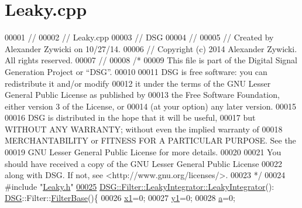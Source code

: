 \hypertarget{_leaky_8cpp_source}{\section{Leaky.\+cpp}
\label{_leaky_8cpp_source}
}

\begin{DoxyCode}
00001 \textcolor{comment}{//}
00002 \textcolor{comment}{//  Leaky.cpp}
00003 \textcolor{comment}{//  DSG}
00004 \textcolor{comment}{//}
00005 \textcolor{comment}{//  Created by Alexander Zywicki on 10/27/14.}
00006 \textcolor{comment}{//  Copyright (c) 2014 Alexander Zywicki. All rights reserved.}
00007 \textcolor{comment}{//}
00008 \textcolor{comment}{/*}
00009 \textcolor{comment}{ This file is part of the Digital Signal Generation Project or “DSG”.}
00010 \textcolor{comment}{}
00011 \textcolor{comment}{ DSG is free software: you can redistribute it and/or modify}
00012 \textcolor{comment}{ it under the terms of the GNU Lesser General Public License as published by}
00013 \textcolor{comment}{ the Free Software Foundation, either version 3 of the License, or}
00014 \textcolor{comment}{ (at your option) any later version.}
00015 \textcolor{comment}{}
00016 \textcolor{comment}{ DSG is distributed in the hope that it will be useful,}
00017 \textcolor{comment}{ but WITHOUT ANY WARRANTY; without even the implied warranty of}
00018 \textcolor{comment}{ MERCHANTABILITY or FITNESS FOR A PARTICULAR PURPOSE.  See the}
00019 \textcolor{comment}{ GNU Lesser General Public License for more details.}
00020 \textcolor{comment}{}
00021 \textcolor{comment}{ You should have received a copy of the GNU Lesser General Public License}
00022 \textcolor{comment}{ along with DSG.  If not, see <http://www.gnu.org/licenses/>.}
00023 \textcolor{comment}{ */}
00024 \textcolor{preprocessor}{#include "\hyperlink{_leaky_8h}{Leaky.h}"}
\hypertarget{_leaky_8cpp_source_l00025}{}\hyperlink{class_d_s_g_1_1_filter_1_1_leaky_integrator_af0d204e3c2f5f844dc4355810f6515c2}{00025} \hyperlink{class_d_s_g_1_1_filter_1_1_leaky_integrator_af0d204e3c2f5f844dc4355810f6515c2}{DSG::Filter::LeakyIntegrator::LeakyIntegrator}():
      \hyperlink{namespace_d_s_g}{DSG}::Filter::\hyperlink{class_d_s_g_1_1_filter_1_1_filter_base}{FilterBase}()\{
00026     \hyperlink{class_d_s_g_1_1_filter_1_1_leaky_integrator_a052c709de4d6cddfdc0fb0441275ce98}{x1}=0;
00027     \hyperlink{class_d_s_g_1_1_filter_1_1_leaky_integrator_a338246cc32a709070753696cf827624c}{y1}=0;
00028     \hyperlink{class_d_s_g_1_1_filter_1_1_leaky_integrator_a9a321b7650923119fda60595a7659aef}{a}=0;

\end{DoxyCode}
